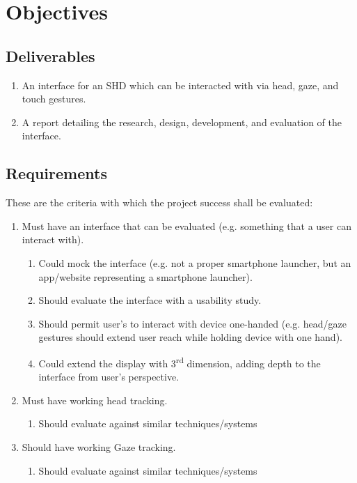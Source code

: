 \section{Objectives}

\subsection{Deliverables}
\begin{enumerate}
    \item An interface for an SHD which can be interacted with via head, gaze, and touch gestures.
    \item A report detailing the research, design, development, and evaluation of the interface.
\end{enumerate}

\subsection{Requirements}
These are the criteria with which the project success shall be evaluated:
\begin{enumerate}
    \item Must have an interface that can be evaluated (e.g. something that a user can interact with).
        \begin{enumerate}
            \item Could mock the interface (e.g. not a proper smartphone launcher, but an app/website representing a smartphone launcher).
            \item Should evaluate the interface with a usability study.
            \item Should permit user's to interact with device one-handed (e.g. head/gaze gestures should extend user reach while holding device with one hand).
            \item Could extend the display with 3\textsuperscript{rd} dimension, adding depth to the interface from user's perspective.
        \end{enumerate}
    \item Must have working head tracking.
        \begin{enumerate}
            \item Should evaluate against similar techniques/systems
        \end{enumerate}
    \item Should have working Gaze tracking.
        \begin{enumerate}
            \item Should evaluate against similar techniques/systems
        \end{enumerate}
\end{enumerate}
